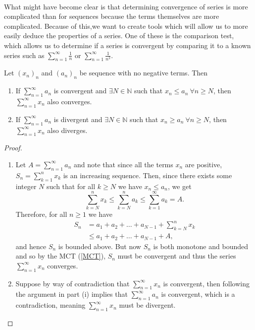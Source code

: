 \documentclass[../real_analysis.tex]{subfiles}
\begin{document}
        \paragraph{}
        What might have become clear is that determining convergence of series is more complicated than for sequences because the terms themselves are more complicated. Because of this,we want to create tools which will allow us to more easily deduce the properties of a series. One of these is the comparison test, which allows us to determine if a series is convergent by comparing it to a known series such as $\sum_{n=1}^\infty\frac{1}{n}$ or $\sum_{n=1}^\infty\frac{1}{n^2}$.
        \begin{theorem}\label{comparison-test}
            Let $(x_n)_n$ and $(a_n)_n$ be sequence with no negative terms. Then
            \begin{enumerate}[label={\upshape(\roman*)}]
                \item If $\sum_{n=1}^\infty a_n$ is convergent and $\exists N\in\mathbb{N}$ such that $x_n\leq a_n\ \forall n\geq N$, then $\sum_{n=1}^\infty x_n$ also converges.
                \item If $\sum_{n=1}^\infty a_n$ is divergent and $\exists N\in\mathbb{N}$ such that $x_n\geq a_n\ \forall n\geq N$, then $\sum_{n=1}^\infty x_n$ also diverges.
            \end{enumerate}
        \end{theorem}
        \begin{proof}\\
            \begin{enumerate}[label={\upshape(\roman*)}]
                \item Let $A=\sum_{n=1}^\infty a_n$ and note that since all the terms $x_n$ are positive, $S_n=\sum_{k=1}^n x_k$ is an increasing sequence. Then, since there exists some integer $N$ such that for all $k\geq N$ we have $x_n\leq a_n$, we get
                \begin{equation*}
                    \sum_{k=N}^n x_k\leq\sum_{k=N}^n a_k\leq\sum_{k=1}^\infty a_k=A.
                \end{equation*}
                Therefore, for all $n\geq1$ we have
                \begin{align*}
                    S_n&=a_1+a_2+\dots+a_{N-1}+\sum_{k=N}^n x_k\\
                    &\leq a_1+a_2+\dots+a_{N-1}+A,
                \end{align*}
                and hence $S_n$ is bounded above. But now $S_n$ is both monotone and bounded and so by the MCT (\ref{MCT}), $S_n$ must be convergent and thus the series $\sum_{n=1}^\infty x_n$ converges.
                \item Suppose by way of contradiction that $\sum_{n=1}^\infty x_n$ is convergent, then following the argument in part (i) implies that $\sum_{n=1}^\infty a_n$ is convergent, which is a contradiction, meaning $\sum_{n=1}^\infty x_n$ must be divergent.
            \end{enumerate}
        \end{proof}
\end{document}
